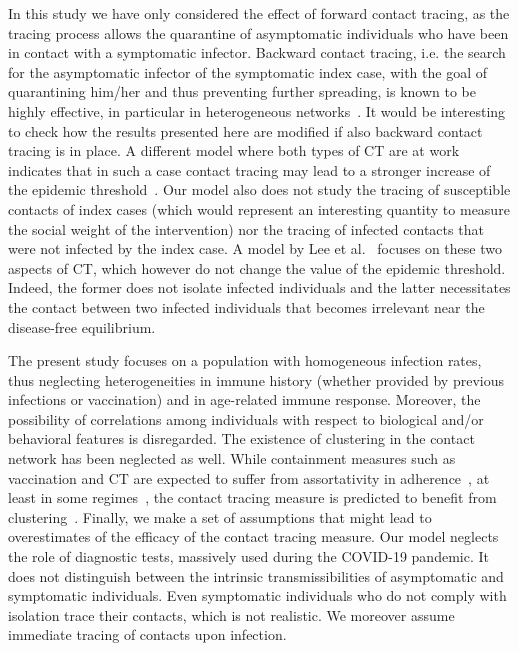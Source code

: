 \documentclass[aps,twocolumn,superscriptaddress,nofootinbib,pre,floatfix]{revtex4-1}
\begin{document}
In this study we have only considered the effect of forward contact
tracing, as the tracing process allows the quarantine of asymptomatic
individuals who have been in contact with a symptomatic infector.
Backward contact tracing, i.e. the search for the asymptomatic
infector of the symptomatic index case, with the goal of quarantining
him/her and thus preventing further spreading, is known to be highly
effective, in particular in heterogeneous networks~\cite{kojaku21}. It
would be interesting to check how the results presented here are
modified if also backward contact tracing is in place.  A different
model where both types of CT are at work indicates that in such a case
contact tracing may lead to a stronger increase of the epidemic
threshold~\cite{Mancastroppa21}.  Our model also does not study the
tracing of susceptible contacts of index cases (which would represent
an interesting quantity to measure the social weight of the intervention) nor
the tracing of infected contacts that were not infected by the index
case.  A model by Lee et al.~\cite{Lee} focuses on these two aspects
of CT, which however do not change the value of the epidemic threshold.
Indeed, the former does not isolate infected individuals and the latter
necessitates the contact between two infected individuals that becomes
irrelevant near the disease-free equilibrium.

The present study focuses on a population with homogeneous infection rates,
thus neglecting heterogeneities in immune history (whether provided by
previous infections or vaccination) and in age-related immune
response.  Moreover, the possibility of correlations among individuals
with respect to biological and/or behavioral features is disregarded.
The existence of clustering in the contact network has been neglected
as well.  While containment measures such as vaccination and CT are
expected to suffer from assortativity in adherence~\cite{Glaubitz,
  Rizi}, at least in some regimes~\cite{Burgio}, the contact tracing
measure is predicted to benefit from clustering~\cite{House,
  Burdinski, Kiss}.  Finally, we make a set of assumptions that might lead
to overestimates of the efficacy of the contact tracing measure. Our
model neglects the role of diagnostic tests, massively used during the
COVID-19 pandemic. It does not distinguish between the intrinsic
transmissibilities of asymptomatic and symptomatic individuals. Even
symptomatic individuals who do not comply with isolation trace their
contacts, which is not realistic. We moreover assume immediate tracing
of contacts upon infection.
\end{document}
